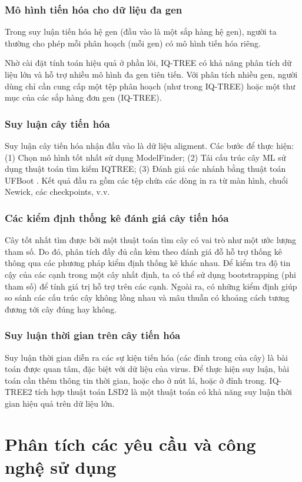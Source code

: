 \documentclass[12pt]{report}
\begin{document}
\subsection{Mô hình tiến hóa cho dữ liệu đa gen}
Trong suy luận tiến hóa hệ gen (đầu vào là một sắp hàng hệ gen), người ta thường cho phép mỗi phân hoạch (mỗi gen) có mô hình tiến hóa riêng.

Nhờ cài đặt tính toán hiệu quả ở phần lõi, IQ-TREE có khả năng phân tích dữ liệu lớn và hỗ trợ nhiều mô hình đa gen tiên tiến. Với phân tích nhiều gen, người dùng chỉ cần cung cấp một tệp phân hoạch (như trong IQ-TREE) hoặc một thư mục của các sắp hàng đơn gen (IQ-TREE).
\subsection{Suy luận cây tiến hóa}
Suy luận cây tiến hóa nhận đầu vào là dữ liệu aligment. Các bước để thực hiện: (1) Chọn mô hình tốt nhất sử dụng ModelFinder\cite{cia-20.5}; (2) Tái cấu trúc cây ML sử dụng thuật toán tìm kiếm IQTREE; (3) Đánh giá các nhánh bằng thuật toán UFBoot \cite{cia-21.5}. Kết quả đầu ra gồm các tệp chứa các dòng in ra từ màn hình, chuổi Newick, các checkpoints, v.v.
\subsection{Các kiểm định thống kê đánh giá cây tiến hóa}
Cây tốt nhất tìm được bởi một thuật toán tìm cây có vai trò như một ước lượng tham số. Do đó, phân tích đầy đủ cần kèm theo đánh giá đỗ hỗ trợ thống kê thông qua các phương pháp kiểm định thống kê khác nhau. Để kiểm tra độ tin cậy của các cạnh trong một cây nhất định, ta có thể sử dụng bootstrapping (phi tham số) để tính giá trị hỗ trợ trên các cạnh. Ngoài ra, có những kiểm định giúp so sánh các cấu trúc cây không lồng nhau và mâu thuẫn có khoảng cách tương đương tới cây đúng hay không.
\subsection{Suy luận thời gian trên cây tiến hóa}
Suy luận thời gian diễn ra các sự kiện tiến hóa (các đỉnh trong của cây) là bài toán được quan tâm, đặc biệt với dữ liệu của virus. Để thực hiện suy luận, bài toán cần thêm thông tin thời gian, hoặc cho ở nút lá, hoặc ở đỉnh trong. IQ-TREE2 tích hợp thuật toán LSD2 \cite{cia-17} là một thuật toán có khả năng suy luận thời gian hiệu quả trên dữ liệu lớn.

\newpage	
\chapter{Phân tích các yêu cầu và công nghệ sử dụng}
\label{chap:chapter3}
\end{document}
